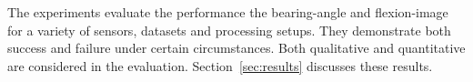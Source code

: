 The experiments evaluate the performance the \gls{bearing-angle} and \gls{flexion-image} for a variety of sensors, datasets and processing setups.
They demonstrate both success and failure under certain circumstances.
Both qualitative and quantitative are considered in the evaluation.
Section~\ref{sec:results} discusses these results.
